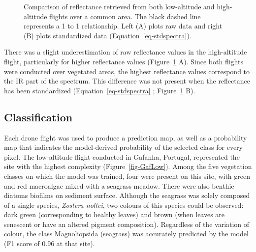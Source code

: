 \documentclass[
  letterpaper,
  11pt,
  english,
  singlespacing,
  headsepline]{MastersDoctoralThesis}
\begin{document}
\begin{spacing}{1.5}
\begin{figure}

\caption{\label{fig-CompareRef}Comparison of reflectance retrieved from
both low-altitude and high-altitude flights over a common area. The
black dashed line represents a 1 to 1 relationship. Left (A) plots raw
data and right (B) plots standardized data
(Equation~\ref{eq-stdspectra}).}

\end{figure}%

There was a slight underestimation of raw reflectance values in the
high-altitude flight, particularly for higher reflectance values
(Figure~\ref{fig-CompareRef} A). Since both flights were conducted over
vegetated areas, the highest reflectance values correspond to the IR
part of the spectrum. This difference was not present when the
reflectance has been standardized (Equation~\ref{eq-stdspectra} ;
Figure~\ref{fig-CompareRef} B).

\subsection{Classification}\label{classification}

Each drone flight was used to produce a prediction map, as well as a
probability map that indicates the model-derived probability of the
selected class for every pixel. The low-altitude flight conducted in
Gafanha, Portugal, represented the site with the highest complexity
(Figure~\ref{fig-GafLow}). Among the five vegetation classes on which
the model was trained, four were present on this site, with green and
red macroalgae mixed with a seagrass meadow. There were also benthic
diatoms biofilms on sediment surface. Although the seagrass was solely
composed of a single species, \emph{Zostera noltei}, two colours of this
species could be observed: dark green (corresponding to healthy leaves)
and brown (when leaves are senescent or have an altered pigment
composition). Regardless of the variation of colour, the class
Magnoliopsida (seagrass) was accurately predicted by the model (F1 score
of 0.96 at that site).


\end{spacing}
\end{document}
